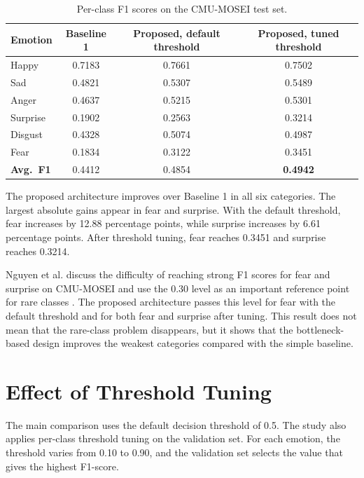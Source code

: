 \begin{table}[H]
\centering
\caption{Per-class F1 scores on the CMU-MOSEI test set.}
\label{tab:perclass}
\begin{tabular}{lccc}
\hline
\textbf{Emotion} & \textbf{Baseline 1} & \textbf{Proposed, default threshold} & \textbf{Proposed, tuned threshold} \\
\hline
Happy    & 0.7183 & 0.7661 & 0.7502 \\
Sad      & 0.4821 & 0.5307 & 0.5489 \\
Anger    & 0.4637 & 0.5215 & 0.5301 \\
Surprise & 0.1902 & 0.2563 & 0.3214 \\
Disgust  & 0.4328 & 0.5074 & 0.4987 \\
Fear     & 0.1834 & 0.3122 & 0.3451 \\
\hline
\textbf{Avg.~F1} & 0.4412 & 0.4854 & \textbf{0.4942} \\
\hline
\end{tabular}
\end{table}

The proposed architecture improves over Baseline 1 in all six categories. The largest absolute gains appear in fear and surprise. With the default threshold, fear increases by 12.88 percentage points, while surprise increases by 6.61 percentage points. After threshold tuning, fear reaches 0.3451 and surprise reaches 0.3214.

Nguyen et al. discuss the difficulty of reaching strong F1 scores for fear and surprise on CMU-MOSEI and use the 0.30 level as an important reference point for rare classes \cite{nguyen2025enhanced}. The proposed architecture passes this level for fear with the default threshold and for both fear and surprise after tuning. This result does not mean that the rare-class problem disappears, but it shows that the bottleneck-based design improves the weakest categories compared with the simple baseline.


\section{Effect of Threshold Tuning}
\label{sec:threshold}

The main comparison uses the default decision threshold of 0.5. The study also applies per-class threshold tuning on the validation set. For each emotion, the threshold varies from 0.10 to 0.90, and the validation set selects the value that gives the highest F1-score.

